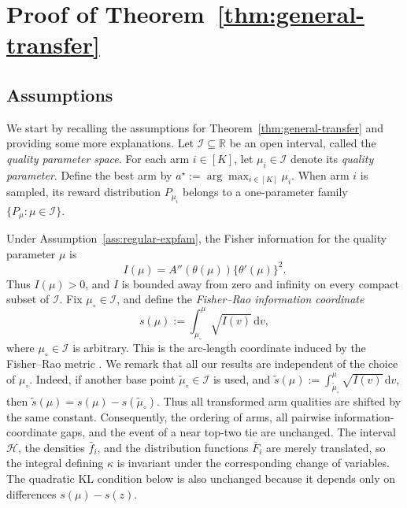 \documentclass[10pt]{article}
\newcommand{\dd}{\mathrm{d}}
\theoremstyle{plain}
\begin{document}
\section{Proof of Theorem~\ref{thm:general-transfer}} \label{app:pf_thm_general}

\subsection{Assumptions}

We start by recalling the assumptions for Theorem~\ref{thm:general-transfer} and providing some more explanations.
Let \(\mathcal I\subseteq \mathbb R\) be an open interval, called the
{\em quality parameter space}. For each arm \(i\in[K]\), let
\(\mu_i\in\mathcal I\) denote its {\em quality parameter}. Define the best
arm by $a^\star := \arg\max_{i\in[K]}\mu_i$. 
When arm \(i\) is sampled, its reward distribution $P_{\mu_i}$ belongs to a one-parameter
family \(\{P_\mu:\mu\in\mathcal I\}\).


\begingroup
\renewcommand{\thesection}{4}
\AssRegularExpfam*
\endgroup
Under Assumption~\ref{ass:regular-expfam}, the Fisher information for the
quality parameter \(\mu\) is
\[
    I(\mu)
    =
    A''(\theta(\mu))\{\theta'(\mu)\}^2 .
\]
Thus \(I(\mu)>0\), and \(I\) is bounded away from zero and infinity on every
compact subset of \(\mathcal I\).  Fix \(\mu_\circ\in\mathcal I\), and
define the \emph{Fisher--Rao information coordinate}
\[
    s(\mu)
    :=
    \int_{\mu_\circ}^\mu\sqrt{I(v)}\,\dd v,
\]
where \(\mu_\circ\in\mathcal I\) is arbitrary. This is the arc-length coordinate induced by the
Fisher--Rao metric \citep{Rao1992,amari2000methods}.
We remark that all our results are independent of the choice of \(\mu_\circ\).
Indeed, if another base point \(\widetilde\mu_\circ\in\mathcal I\) is used, and 
$\widetilde s(\mu) := \int_{\widetilde\mu_\circ}^{\mu}\sqrt{I(v)}\,\dd v$,
then $\widetilde s(\mu) = s(\mu)-s(\widetilde\mu_\circ)$. Thus all transformed arm qualities are shifted by the same constant. Consequently, the ordering of arms, all pairwise information-coordinate gaps, and the event of
a near top-two tie are unchanged. The interval \(\mathcal H\), the densities
\(\bar f_i\), and the distribution functions \(\bar F_i\) are merely translated,
so the integral defining \(\kappa\) is invariant under the corresponding change
of variables. The quadratic KL condition below is also unchanged because it
depends only on differences \(s(\mu)-s(z)\).
\end{document}
